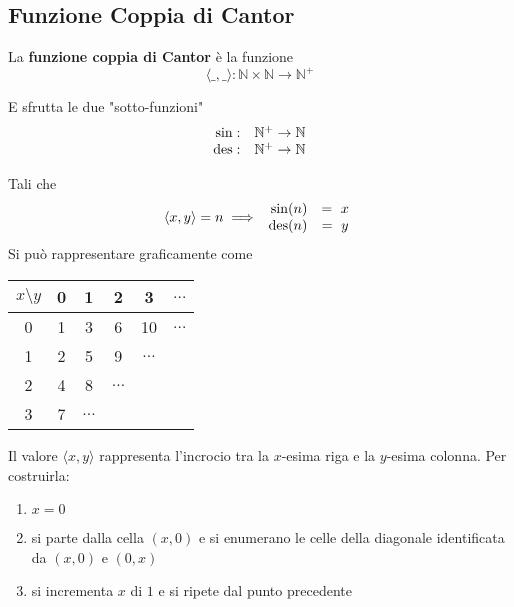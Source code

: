 \subsection{Funzione Coppia di Cantor}

La \textbf{funzione coppia di Cantor} è la funzione
$$ \langle \_ , \_ \rangle: \mathbb{N} \times \mathbb{N} \rightarrow \mathbb{N}^+ $$

E sfrutta le due "sotto-funzioni" 
$$
\begin{array}{r c}
	\sin: & \mathbb{N}^+ \rightarrow \mathbb{N} \\
	\operatorname{des}: & \mathbb{N}^+ \rightarrow \mathbb{N}
\end{array}
$$

Tali che 
$$ \langle x,y \rangle = n \implies \begin{array}{r c}
	\sin (n) & = \ x \\
	\operatorname{des} (n) & = \ y
\end{array}$$
Si può rappresentare graficamente come

\begin{center}
	\begin{minipage}[h]{0.45\textwidth}
		{\renewcommand{\arraystretch}{1.3}
			\begin{tabular}{c | c c c c c}
				$x\setminus y$ & 0 & 1 & 2 & 3 & $\dots$ \\ 
				\hline
				0 & 1 & 3 & 6 & 10 & $\dots$ \\
				1 & 2 & 5 & 9 & $\dots$ & \\
				2 & 4 & 8 & $\dots$ && \\
				3 & 7 & $\dots$ &&& \\
		\end{tabular}}
	\end{minipage}
	\hfill 
	\begin{minipage}[h]{0.45\textwidth}
		
	\end{minipage}
\end{center}

Il valore $\langle x,y \rangle$ rappresenta l'incrocio tra la $x$-esima riga e la $y$-esima colonna. Per costruirla:
\begin{enumerate}
	\item $x = 0$
    
	\item si parte dalla cella $(x,0)$ e si enumerano le celle della diagonale identificata da $(x,0)$ e $(0,x)$
	
    \item si incrementa $x$ di $1$ e si ripete dal punto precedente
\end{enumerate}


